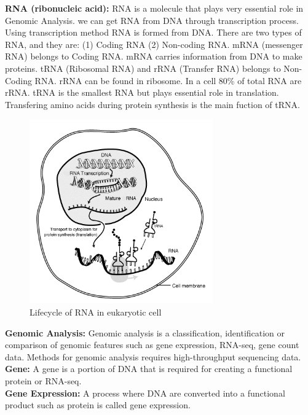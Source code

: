 \textbf{RNA (ribonucleic acid):} RNA is a molecule that plays very essential role in Genomic Analysis. we can get RNA from DNA through transcription process. Using transcription method RNA is formed from DNA. There are two types of RNA, and they are: (1) Coding RNA (2) Non-coding RNA. mRNA (messenger RNA) belongs to Coding RNA. mRNA carries information from DNA to make proteins. tRNA (Ribosomal RNA) and rRNA (Transfer RNA) belongs to Non-Coding RNA. rRNA can be found in ribosome. In a cell 80\% of total RNA are rRNA. tRNA is the smallest RNA but plays essential role in translation. Transfering amino acids during protein synthesis is the main fuction of tRNA.\\[5pt]

\begin{figure}[H]
    \centering
    \includegraphics[width=0.70\textwidth]{rna}
    \caption{Lifecycle of RNA in eukaryotic cell \cite{wiki:RNA} }
    \label{fig:rnafig}
\end{figure}

\textbf{Genomic Analysis:} Genomic analysis is a classification, identification or comparison of genomic features such as gene expression, RNA-seq, gene count data. Methods for genomic analysis requires high-throughput sequencing data.\\[5pt]

\textbf{Gene:} A gene is a portion of DNA that is required for creating a functional protein or RNA-seq.\\[5pt]

\textbf{Gene Expression:} A process where DNA are converted into a functional product such as protein is called gene expression.\\[5pt]

